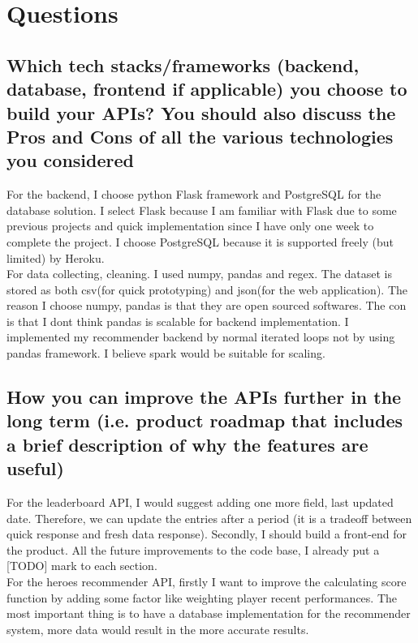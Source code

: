 \section{Questions}

\subsection{Which tech stacks/frameworks (backend, database, frontend if applicable) you choose to build your APIs? You should also discuss the Pros and Cons of all the various technologies you considered}

For the backend, I choose python Flask framework and PostgreSQL for the database solution. I select Flask because I am familiar with Flask due to some previous projects and quick implementation since I have only one week to complete the project. I choose PostgreSQL because it is supported freely (but limited) by Heroku. \\

\noindent For data collecting, cleaning. I used numpy, pandas and regex. The dataset is stored as both csv(for quick prototyping) and json(for the web application). The reason I choose numpy, pandas is that they are open sourced softwares. The con is that I dont think pandas is scalable for backend implementation. I implemented my recommender backend by normal iterated loops not by using pandas framework. I believe spark would be suitable for scaling.

\subsection{How you can improve the APIs further in the long term (i.e. product roadmap that includes a brief description of why the features are useful)}

For the leaderboard API, I would suggest adding one more field, last updated date. Therefore, we can update the entries after a period (it is a tradeoff between quick response and fresh data response). Secondly, I should build a front-end for the product. All the future improvements to the code base, I already put a [TODO] mark to each section. \\

\noindent For the heroes recommender API, firstly I want to improve the calculating score function by adding some factor like weighting player recent performances. The most important thing is to have a database implementation for the recommender system, more data would result in the more accurate results. \\

